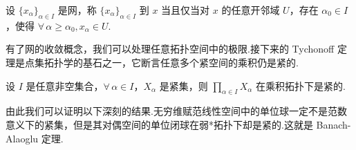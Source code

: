 \begin{definition}[网的收敛]
    设 $\{x_\alpha\}_{\alpha\in I}$ 是网，称 $\{x_\alpha\}_{\alpha\in I}$ 到 $x$ 当且仅当对 $x$ 的任意开邻域 $U$，存在 $\alpha_0\in I$，使得 $\forall\, \alpha\geq \alpha_0, x_\alpha\in U$.
\end{definition}

有了网的收敛概念，我们可以处理任意拓扑空间中的极限.接下来的 Tychonoff 定理是点集拓扑学的基石之一，它断言任意多个紧空间的乘积仍是紧的.

\begin{theorem}[Tychonoff 定理]
    设 $I$ 是任意非空集合，$\forall\, \alpha\in I$，$X_\alpha$ 是紧集，则 $\prod_{\alpha\in I} X_\alpha$ 在乘积拓扑下是紧的.
\end{theorem}

由此我们可以证明以下深刻的结果.无穷维赋范线性空间中的单位球一定不是范数意义下的紧集，但是其对偶空间的单位闭球在弱*拓扑下却是紧的.这就是 Banach-Alaoglu 定理.

